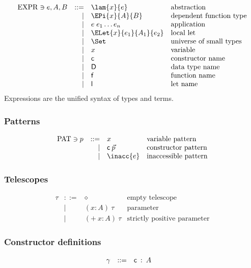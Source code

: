 \[
\begin{array}{lrll}
\Expr \ni e,A,B & ::= & \lam{x}{e} & \mbox{abstraction}\\
& \mid & \EPi{x}{A}{B} & \mbox{dependent function type}\\
& \mid & e \; e_1 \ldots e_n & \mbox{application}\\
& \mid & \ELet{x}{e_1}{A_1}{e_2} & \mbox{local let}\\ 
& \mid & \Set & \mbox{universe of small types}\\
& \mid & x & \mbox{variable}\\
& \mid & \cc & \mbox{constructor name}\\
& \mid & \DD & \mbox{data type name}\\
& \mid & \ff & \mbox{function name}\\
& \mid & \dd & \mbox{let name}
\end{array}
\]
Expressions are the unified syntax of types and terms.

\subsubsection{Patterns}
\[
\begin{array}{lrll}
\Pat \ni p & ::= & x & \mbox{variable pattern}\\
& \mid & \cc \: \vec{p} & \mbox{constructor pattern}\\
& \mid & \inacc{e} & \mbox{inaccessible pattern}\\
\end{array}
\]

\subsubsection{Telescopes}
\[
\begin{array}{lrll}
\tau & ::= & \diamond & \mbox{empty telescope}\\
& \mid & ( x : A ) \: \tau & \mbox{parameter}\\
& \mid & ( + \: x : A ) \: \tau & \mbox{strictly positive parameter}
\end{array}
\]

\subsubsection{Constructor definitions}
\[
\begin{array}{lrll}
\gamma &  ::= & \mathsf{c} \: : \: A & 
\end{array}
\]

